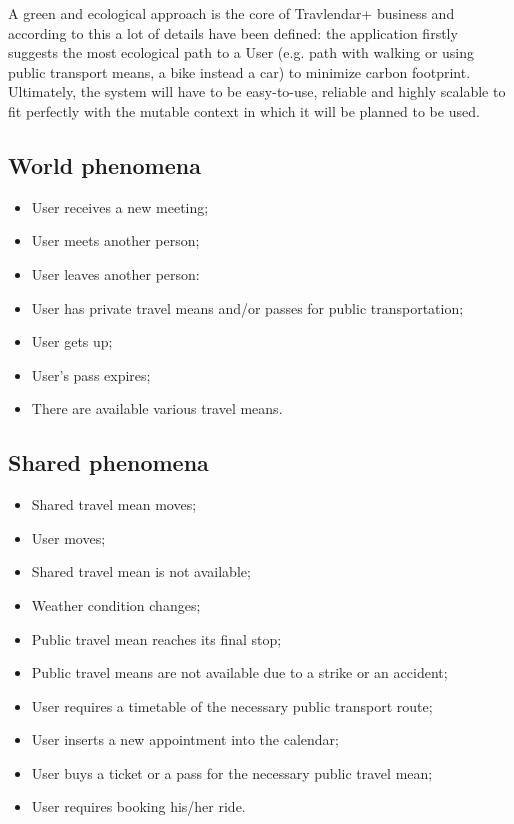 \documentclass[a4paper]{book}
\begin{document}
A green and ecological approach is the core of Travlendar+ business and according to this a lot of details have been defined:  the application firstly suggests the most ecological path to a User (e.g. path with walking or using public transport means, a bike instead a car) to minimize carbon footprint. 
Ultimately, the system will have to be easy-to-use, reliable and highly scalable to fit perfectly  with the mutable context in which it will be planned to be used.


\subsection{World phenomena}

\begin{itemize}
	\item User receives a new meeting;
	\item User meets another person;
	\item User leaves another person:
	\item User has private travel means and/or passes for public transportation;
	\item User gets up;
	\item User's pass expires; 
	\item There are available various travel means.
\end{itemize}

\subsection{Shared phenomena}

\begin{itemize}
	\item Shared travel mean moves;
	\item User moves;
	\item Shared travel mean is not available;
	\item Weather condition changes;
	\item Public travel mean reaches its final stop;
	\item Public travel means are not available due to a strike or an accident;
	\item User requires a timetable of the necessary public transport route;
	\item User inserts a new appointment into the calendar;
	\item User buys a ticket or a pass for the necessary public travel mean;
	\item User requires booking his/her ride.	 
\end{itemize}
\end{document}
